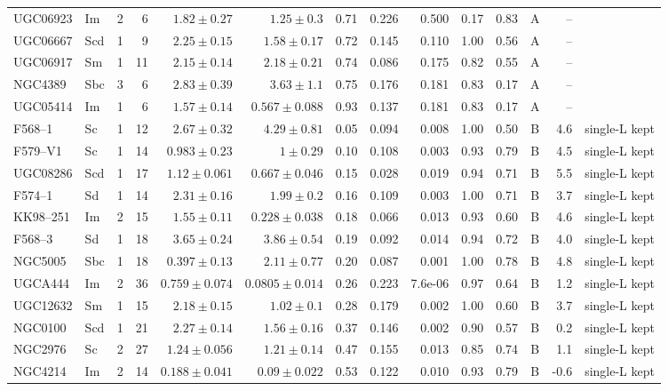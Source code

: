 \documentclass[9pt]{extarticle}
\begin{document}
{\begin{longtable}{lllrrrrrrrrcrl}
UGC06923 & Im & 2 & 6 & $1.82\pm0.27$ & $1.25\pm0.3$ & 0.71 & 0.226 & 0.500 & 0.17 & 0.83 & A & -- & \\
UGC06667 & Scd & 1 & 9 & $2.25\pm0.15$ & $1.58\pm0.17$ & 0.72 & 0.145 & 0.110 & 1.00 & 0.56 & A & -- & \\
UGC06917 & Sm & 1 & 11 & $2.15\pm0.14$ & $2.18\pm0.21$ & 0.74 & 0.086 & 0.175 & 0.82 & 0.55 & A & -- & \\
NGC4389 & Sbc & 3 & 6 & $2.83\pm0.39$ & $3.63\pm1.1$ & 0.75 & 0.176 & 0.181 & 0.83 & 0.17 & A & -- & \\
UGC05414 & Im & 1 & 6 & $1.57\pm0.14$ & $0.567\pm0.088$ & 0.93 & 0.137 & 0.181 & 0.83 & 0.17 & A & -- & \\
\midrule
F568--1 & Sc & 1 & 12 & $2.67\pm0.32$ & $4.29\pm0.81$ & 0.05 & 0.094 & 0.008 & 1.00 & 0.50 & B & 4.6 & single-L kept\\
F579--V1 & Sc & 1 & 14 & $0.983\pm0.23$ & $1\pm0.29$ & 0.10 & 0.108 & 0.003 & 0.93 & 0.79 & B & 4.5 & single-L kept\\
UGC08286 & Scd & 1 & 17 & $1.12\pm0.061$ & $0.667\pm0.046$ & 0.15 & 0.028 & 0.019 & 0.94 & 0.71 & B & 5.5 & single-L kept\\
F574--1 & Sd & 1 & 14 & $2.31\pm0.16$ & $1.99\pm0.2$ & 0.16 & 0.109 & 0.003 & 1.00 & 0.71 & B & 3.7 & single-L kept\\
KK98--251 & Im & 2 & 15 & $1.55\pm0.11$ & $0.228\pm0.038$ & 0.18 & 0.066 & 0.013 & 0.93 & 0.60 & B & 4.6 & single-L kept\\
F568--3 & Sd & 1 & 18 & $3.65\pm0.24$ & $3.86\pm0.54$ & 0.19 & 0.092 & 0.014 & 0.94 & 0.72 & B & 4.0 & single-L kept\\
NGC5005 & Sbc & 1 & 18 & $0.397\pm0.13$ & $2.11\pm0.77$ & 0.20 & 0.087 & 0.001 & 1.00 & 0.78 & B & 4.8 & single-L kept\\
UGCA444 & Im & 2 & 36 & $0.759\pm0.074$ & $0.0805\pm0.014$ & 0.26 & 0.223 & 7.6e-06 & 0.97 & 0.64 & B & 1.2 & single-L kept\\
UGC12632 & Sm & 1 & 15 & $2.18\pm0.15$ & $1.02\pm0.1$ & 0.28 & 0.179 & 0.002 & 1.00 & 0.60 & B & 3.7 & single-L kept\\
NGC0100 & Scd & 1 & 21 & $2.27\pm0.14$ & $1.56\pm0.16$ & 0.37 & 0.146 & 0.002 & 0.90 & 0.57 & B & 0.2 & single-L kept\\
NGC2976 & Sc & 2 & 27 & $1.24\pm0.056$ & $1.21\pm0.14$ & 0.47 & 0.155 & 0.013 & 0.85 & 0.74 & B & 1.1 & single-L kept\\
NGC4214 & Im & 2 & 14 & $0.188\pm0.041$ & $0.09\pm0.022$ & 0.53 & 0.122 & 0.010 & 0.93 & 0.79 & B & -0.6 & single-L kept\\

\end{longtable}}
\end{document}
